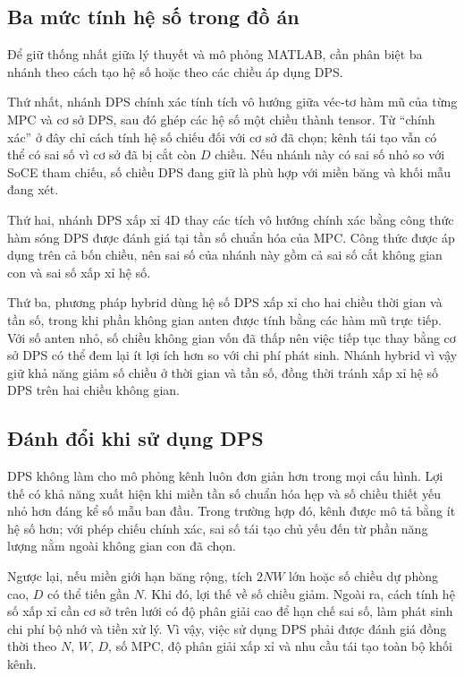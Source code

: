 \subsection{Ba mức tính hệ số trong đồ án}
\label{subsec:ch2_three_coefficients}

Để giữ thống nhất giữa lý thuyết và mô phỏng MATLAB, cần phân biệt ba nhánh theo cách tạo hệ số hoặc theo các chiều áp dụng DPS.

Thứ nhất, nhánh DPS chính xác tính tích vô hướng giữa véc-tơ hàm mũ của từng MPC và cơ sở DPS, sau đó ghép các hệ số một chiều thành tensor. Từ ``chính xác'' ở đây chỉ cách tính hệ số chiếu đối với cơ sở đã chọn; kênh tái tạo vẫn có thể có sai số vì cơ sở đã bị cắt còn \(D\) chiều. Nếu nhánh này có sai số nhỏ so với SoCE tham chiếu, số chiều DPS đang giữ là phù hợp với miền băng và khối mẫu đang xét.

Thứ hai, nhánh DPS xấp xỉ 4D thay các tích vô hướng chính xác bằng công thức hàm sóng DPS được đánh giá tại tần số chuẩn hóa của MPC. Công thức được áp dụng trên cả bốn chiều, nên sai số của nhánh này gồm cả sai số cắt không gian con và sai số xấp xỉ hệ số.

Thứ ba, phương pháp hybrid dùng hệ số DPS xấp xỉ cho hai chiều thời gian và tần số, trong khi phần không gian anten được tính bằng các hàm mũ trực tiếp. Với số anten nhỏ, số chiều không gian vốn đã thấp nên việc tiếp tục thay bằng cơ sở DPS có thể đem lại ít lợi ích hơn so với chi phí phát sinh. Nhánh hybrid vì vậy giữ khả năng giảm số chiều ở thời gian và tần số, đồng thời tránh xấp xỉ hệ số DPS trên hai chiều không gian.

\subsection{Đánh đổi khi sử dụng DPS}
\label{subsec:ch2_tradeoff}

DPS không làm cho mô phỏng kênh luôn đơn giản hơn trong mọi cấu hình. Lợi thế có khả năng xuất hiện khi miền tần số chuẩn hóa hẹp và số chiều thiết yếu nhỏ hơn đáng kể số mẫu ban đầu. Trong trường hợp đó, kênh được mô tả bằng ít hệ số hơn; với phép chiếu chính xác, sai số tái tạo chủ yếu đến từ phần năng lượng nằm ngoài không gian con đã chọn.

Ngược lại, nếu miền giới hạn băng rộng, tích \(2NW\) lớn hoặc số chiều dự phòng cao, \(D\) có thể tiến gần \(N\). Khi đó, lợi thế về số chiều giảm. Ngoài ra, cách tính hệ số xấp xỉ cần cơ sở trên lưới có độ phân giải cao để hạn chế sai số, làm phát sinh chi phí bộ nhớ và tiền xử lý. Vì vậy, việc sử dụng DPS phải được đánh giá đồng thời theo \(N\), \(W\), \(D\), số MPC, độ phân giải xấp xỉ và nhu cầu tái tạo toàn bộ khối kênh.

